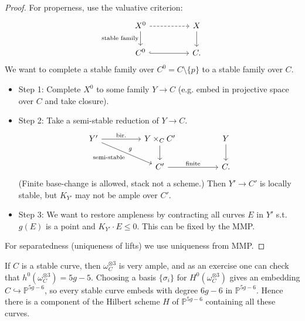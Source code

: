 \documentclass{article}
\theoremstyle{definition}
\renewcommand{\P}{\mathbb{P}}
\begin{document}
\begin{proof}
    For properness, use the valuative criterion:
    \begin{equation*}
        \begin{tikzcd}[column sep=huge]
            X^0 \ar[d,"\text{stable family}"'] \ar[r,dashed] & X \ar[d] \\
            C^0 \ar[r,hook] & C.
        \end{tikzcd}
    \end{equation*}
    We want to complete a stable family over $C^0=C\setminus\{p\}$ to a stable
    family over $C$.
    \begin{itemize}
        \item Step 1: Complete $X^0$ to some family $Y\to C$ (e.g. embed in
            projective space over $C$ and take closure).

        \item Step 2: Take a semi-stable reduction of $Y\to C$.
            \begin{equation*}
                \begin{tikzcd}[column sep=huge]
                    Y' \ar[r,"\text{bir.}"] \ar[dr,"g","\text{semi-stable}"'] &
                    Y\times_CC' \ar[d] & Y \ar[d] \\
                                       & C' \ar[r,"\text{finite}"] & C.
                \end{tikzcd}
            \end{equation*}
            (Finite base-change is allowed, stack not a scheme.) Then $Y'\to C'$
            is locally stable, but $K_{Y'}$ may not be ample over $C'$.

        \item Step 3: We want to restore ampleness by contracting all curves $E$
            in $Y'$ s.t. $g(E)$ is a point and $K_{Y'}\cdot E\le0$. This can be
            fixed by the MMP.
    \end{itemize}
    For separatedness (uniqueness of lifts) we use uniqueness from MMP.
\end{proof}

If $C$ is a stable curve, then $\omega_C^{\otimes 3}$ is very ample, and as an
exercise one can check that $h^0(\omega_C^{\otimes 3})=5g-5$. Choosing a basis
$\{\sigma_i\}$ for $H^0(\omega_C^{\otimes 3})$ gives an embedding
$C\hookrightarrow\P^{5g-6}$, so every stable curve embeds with degree $6g-6$ in
$\P^{5g-6}$. Hence there is a component of the Hilbert scheme $H$ of $\P^{5g-6}$
containing all these curves.
\end{document}
